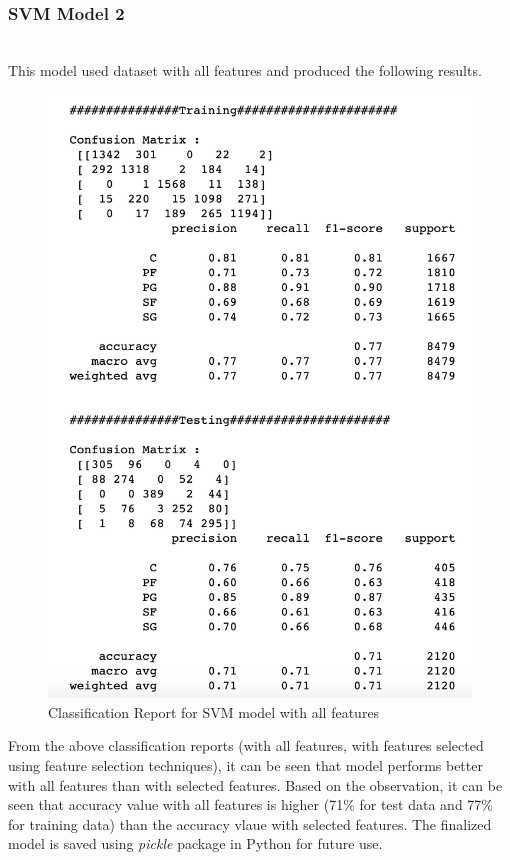 \documentclass[format=sigconf]{acmart}
\begin{document}
\subsubsection{SVM Model 2}
\hfill\\
This model used dataset with all features and produced the following results.
\begin{figure}[H]
    \centering
    \includegraphics[scale=0.40]{images/SVM-Model-2-2-all-features.png}
    \caption{Classification Report for SVM model with all features}
    \label{fig:svmmodel22}
\end{figure}
From the above classification reports (with all features, with features selected using feature selection techniques), it can be 
seen that model performs better with all features than with selected features. Based on the observation, it can be seen 
that accuracy value with all features is higher (71\% for test data and 77\% for training data) than the accuracy vlaue with selected 
features. The finalized model is saved using \textit{pickle} package in Python for future use.
\end{document}
